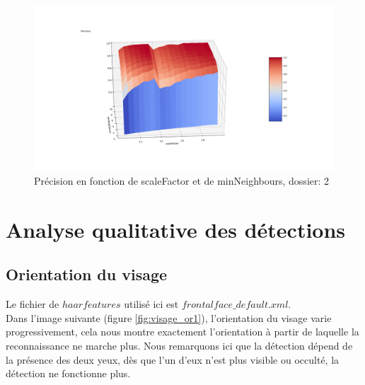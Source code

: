 \documentclass[a4paper,11pt]{article}
\begin{document}
	        \begin{figure}[H]
	            \begin{center}
	        	\includegraphics[scale = 0.4]{images/courbes/precision_fine_scale_2_dossier_2.png}
	        	\caption{Précision en fonction de scaleFactor et de minNeighbours, dossier: 2}
	        	\label{fig:precision_fine_scale_2_dossier_2}
	            \end{center}
	        \end{figure}

\section{Analyse qualitative des détections}
    
    \subsection{Orientation du visage}
	
    Le fichier de $haar features$ utilisé ici est $frontalface\_default.xml$.\\
	Dans l'image suivante (figure \ref{fig:visage_or1}), l'orientation du visage varie
	progressivement, cela nous montre exactement l'orientation à partir de laquelle la
	reconnaissance ne marche plus. Nous remarquons ici que la détection dépend de la présence
	des deux yeux, dès que l'un d'eux n'est plus visible ou occulté, la détection ne fonctionne
	plus.
\end{document}
